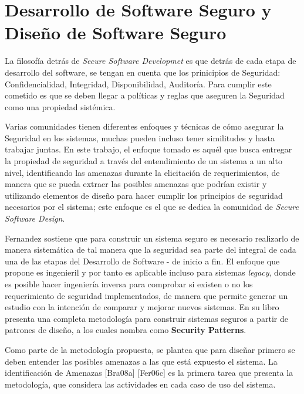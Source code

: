 
\section{Desarrollo de Software Seguro y Diseño de Software Seguro}
\label{chap2:SSD}

La filosofía detrás de \textit{Secure Software Developmet} es que detrás de cada etapa de desarrollo del software, se tengan en cuenta que los prinicipios de Seguridad: Confidencialidad, Integridad, Disponibilidad, Auditoría. Para cumplir este cometido es que se deben llegar a políticas y reglas que aseguren la Seguridad como una propiedad sistémica.

Varias comunidades tienen diferentes enfoques y técnicas de cómo asegurar la Seguridad en los sistemas, muchas pueden incluso tener similitudes y hasta trabajar juntas. En este trabajo, el enfoque tomado es aquél que busca entregar la propiedad de seguridad a través del entendimiento de un sistema a un alto nivel, identificando las amenazas durante la elicitación de requerimientos, de manera que se pueda extraer las posibles amenazas que podrían existir y utilizando elementos de diseño para hacer cumplir los principios de seguridad necesarios por el sistema; este enfoque es el que se dedica la comunidad de \textit{Secure Software Design}. 


Fernandez \cite{fernandez2013security} sostiene que para construir un sistema seguro es necesario realizarlo de manera sistemática de tal manera que la seguridad sea parte del integral de cada una de las etapas del Desarrollo de Software - de inicio a fin. El enfoque que propone es ingenieril y por tanto es aplicable incluso para sistemas \textit{legacy}, donde es posible hacer ingeniería inversa para comprobar si existen o no los requerimiento de seguridad implementados, de manera que permite generar un estudio con la intención de comparar y mejorar nuevos sistemas. En su libro \cite{fernandez2013security} presenta una completa metodología para construir sistemas seguros a partir de patrones de diseño, a los cuales nombra como \textbf{Security Patterns}.

Como parte de la metodología propuesta, se plantea que para diseñar primero se deben entender las posibles amenazas a las que está expuesto el sistema. La identificación de Amenazas [Bra08a] [Fer06c] es la primera tarea que presenta la metodología, que considera las actividades en cada caso de uso del sistema.


